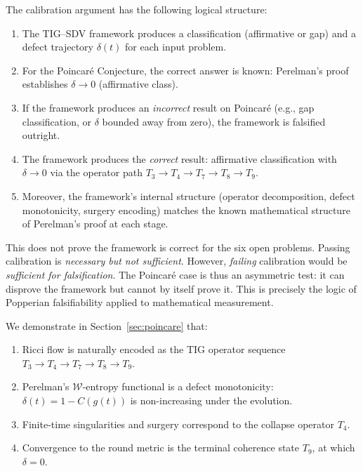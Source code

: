 \documentclass[11pt]{article}
\begin{document}
The calibration argument has the following logical structure:

\begin{enumerate}
\item The TIG--SDV framework produces a classification (affirmative or
gap) and a defect trajectory $\delta(t)$ for each input problem.

\item For the Poincar\'e Conjecture, the correct answer is known:
Perelman's proof establishes $\delta \to 0$ (affirmative class).

\item If the framework produces an \emph{incorrect} result on
Poincar\'e (e.g., gap classification, or $\delta$ bounded away from
zero), the framework is falsified outright.

\item The framework produces the \emph{correct} result: affirmative
classification with $\delta \to 0$ via the operator path
$T_3 \to T_4 \to T_7 \to T_8 \to T_9$.

\item Moreover, the framework's internal structure (operator
decomposition, defect monotonicity, surgery encoding) matches the known
mathematical structure of Perelman's proof at each stage.
\end{enumerate}

\noindent
This does not prove the framework is correct for the six open problems.
Passing calibration is \emph{necessary but not sufficient}.  However,
\emph{failing} calibration would be \emph{sufficient for falsification}.
The Poincar\'e case is thus an asymmetric test: it can disprove the
framework but cannot by itself prove it.  This is precisely the logic
of Popperian falsifiability applied to mathematical measurement.

We demonstrate in Section~\ref{sec:poincare} that:
\begin{enumerate}
\item Ricci flow is naturally encoded as the TIG operator sequence
$T_3 \to T_4 \to T_7 \to T_8 \to T_9$.
\item Perelman's $\mathcal{W}$-entropy functional is a defect
monotonicity: $\delta(t) = 1 - C(g(t))$ is non-increasing under
the evolution.
\item Finite-time singularities and surgery correspond to the collapse
operator $T_4$.
\item Convergence to the round metric is the terminal coherence
state $T_9$, at which $\delta = 0$.
\end{enumerate}
\end{document}
